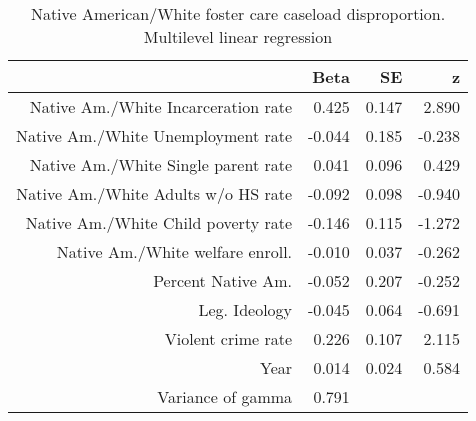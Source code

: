 \begin{table}[ht]
\centering
\begin{tabular}{rrrr}
  \hline
 & Beta & SE & z \\ 
  \hline
Native Am./White Incarceration rate & 0.425 & 0.147 & 2.890 \\ 
  Native Am./White Unemployment rate & -0.044 & 0.185 & -0.238 \\ 
  Native Am./White Single parent rate & 0.041 & 0.096 & 0.429 \\ 
  Native Am./White Adults w/o HS rate & -0.092 & 0.098 & -0.940 \\ 
  Native Am./White Child poverty rate & -0.146 & 0.115 & -1.272 \\ 
  Native Am./White welfare enroll. & -0.010 & 0.037 & -0.262 \\ 
  Percent Native Am. & -0.052 & 0.207 & -0.252 \\ 
  Leg. Ideology & -0.045 & 0.064 & -0.691 \\ 
  Violent crime rate & 0.226 & 0.107 & 2.115 \\ 
  Year & 0.014 & 0.024 & 0.584 \\ 
  Variance of gamma & 0.791 &  &  \\ 
   \hline
\end{tabular}
\caption{Native American/White foster care caseload disproportion. Multilevel linear regression} 
\label{a.d.tab}
\end{table}
